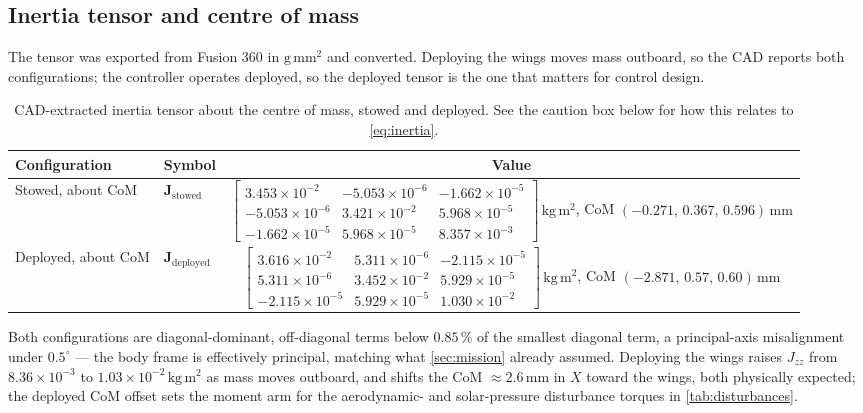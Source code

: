 \documentclass[conference,10pt,a4paper]{IEEEtran}
\newcommand{\mat}[1]{\bm{#1}}
\newcommand{\unit}[1]{\ensuremath{\,\mathrm{#1}}}
\begin{document}
\subsection{Inertia tensor and centre of mass}
\label{sec:inertia}

The tensor was exported from Fusion 360 in $\mathrm{g\,mm^2}$ and converted.
Deploying the wings moves mass outboard, so the CAD reports both
configurations; the controller operates deployed, so the deployed tensor is
the one that matters for control design.

\begin{table}[!t]
\centering
\caption{CAD-extracted inertia tensor about the centre of mass, stowed and
deployed. See the caution box below for how this relates to \cref{eq:inertia}.}
\label{tab:inertia}
\footnotesize
\begin{tabular}{@{}llc@{}}
\toprule
\textbf{Configuration} & \textbf{Symbol} & \textbf{Value} \\
\midrule
Stowed, about CoM & $\mat{J}_\text{stowed}$ &
$\begin{bmatrix}
3.453\times10^{-2} & -5.053\times10^{-6} & -1.662\times10^{-5}\\
-5.053\times10^{-6} & 3.421\times10^{-2} & 5.968\times10^{-5}\\
-1.662\times10^{-5} & 5.968\times10^{-5} & 8.357\times10^{-3}
\end{bmatrix}\unit{kg\,m^2}$, CoM $(-0.271,\,0.367,\,0.596)\unit{mm}$ \\[24pt]
Deployed, about CoM & $\mat{J}_\text{deployed}$ &
$\begin{bmatrix}
3.616\times10^{-2} & 5.311\times10^{-6} & -2.115\times10^{-5}\\
5.311\times10^{-6} & 3.452\times10^{-2} & 5.929\times10^{-5}\\
-2.115\times10^{-5} & 5.929\times10^{-5} & 1.030\times10^{-2}
\end{bmatrix}\unit{kg\,m^2}$, CoM $(-2.871,\,0.57,\,0.60)\unit{mm}$ \\
\bottomrule
\end{tabular}
\end{table}

Both configurations are diagonal-dominant, off-diagonal terms below
$0.85\,\%$ of the smallest diagonal term, a principal-axis misalignment under
$0.5^\circ$ --- the body frame is effectively principal, matching what
\cref{sec:mission} already assumed. Deploying the wings raises $J_{zz}$ from
$8.36\times10^{-3}$ to $1.03\times10^{-2}\unit{kg\,m^2}$ as mass moves outboard,
and shifts the CoM $\approx2.6\unit{mm}$ in $X$ toward the wings, both
physically expected; the deployed CoM offset sets the moment arm for the
aerodynamic- and solar-pressure disturbance torques in \cref{tab:disturbances}.
\end{document}
